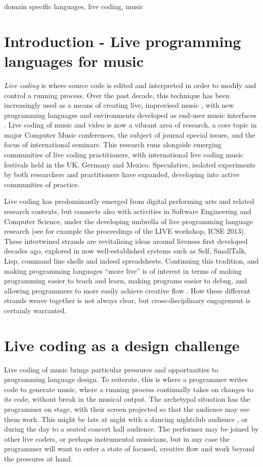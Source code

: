\documentclass[authoryear]{sigplanconf}
\begin{document}
\keywords
domain specific languages, live coding, music

\section{Introduction - Live programming languages for music}

\emph{Live coding} is where source code is edited and interpreted in
order to modify and control a running process. Over the past decade,
this technique has been increasingly used as a means of creating live,
improvised music \citep{Collins03a}, with new programming languages
and environments developed as end-user music interfaces
\citep[e.g.][]{Wang04, Sorensen05, Aaron11, McLean10c}. Live coding of
music and video is now a vibrant area of research, a core topic in
major Computer Music conferences, the subject of journal special
issues, and the focus of international seminars. This research runs
alongside emerging communities of live coding practitioners, with
international live coding music festivals held in the UK, Germany and
Mexico. Speculative, isolated experiments by both researchers and
practitioners have expanded, developing into active communities of
practice.

Live coding has predominantly emerged from digital performing arts and
related research contexts, but connects also with activities in
Software Engineering and Computer Science, under the developing
umbrella of live programming language research (see for example the
proceedings of the LIVE workshop, ICSE 2013). These intertwined
strands are revitalising ideas around liveness first developed decades
ago, explored in now well-established systems such as Self, SmallTalk,
Lisp, command line shells and indeed spreadsheets. Continuing this
tradition, and making programming languages ``more live'' is of
interest in terms of making programming easier to teach and learn,
making programs easier to debug, and allowing programmers to more
easily achieve creative flow \citep{Blackwell14}. How these different
strands weave together is not always clear, but cross-disciplinary
engagement is certainly warranted.

\section{Live coding as a design challenge}

Live coding of music brings particular pressures and opportunities to
programming language design.  To reiterate, this is where a programmer
writes code to generate music, where a running process continually
takes on changes to its code, without break in the musical output. The
archetypal situation has the programmer on stage, with their screen
projected so that the audience may see them work. This might be late
at night with a dancing nightclub audience \citep[e.g. at an
  algorave][]{Collins14}, or during the day to a seated concert hall
audience. The performer may be joined by other live coders, or perhaps
instrumental musicians, but in any case the programmer will want to
enter a state of focused, creative flow and work beyond the pressures
at hand.
\end{document}
